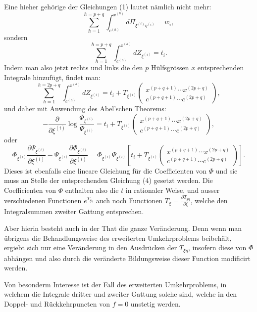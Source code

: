\documentclass[10pt]{article}
\begin{document}
Eine hieher gehörige der Gleichungen (1) lautet nämlich nicht mehr:
\[
\sum_{h=1}^{h=p+q}\int_{c^{(h)}}^{x^{(h)}}d\Pi_{\xi^{(i)}\eta^{(i)}}=w_i,
\]
sondern
\[
\sum_{h=1}^{h=p+q}\int_{c^{(h)}}^{x^{(h)}}dZ_{\xi^{(i)}}=t_i.
\]
Indem man also jetzt rechts und links die den \(p\) Hülfsgrössen \(x\) entsprechenden Integrale hinzufügt, findet man:
\[
\sum_{h=1}^{h=2p+q}\int_{c^{(h)}}^{x^{(h)}}dZ_{\xi^{(i)}}=t_i+T_{\xi^{(i)}}\begin{pmatrix}x^{(p+q+1)}\cdots x^{(2p+q)}\\c^{(p+q+1)}\cdots c^{(2p+q)}\end{pmatrix},
\]
und daher mit Anwendung des Abel'schen Theorems:
\[
-\frac{\partial}{\partial\xi^{(i)}}\log\frac{\Phi_{\xi^{(i)}}}{\Psi_{\xi^{(i)}}}
=t_i+T_{\xi^{(i)}}\begin{pmatrix}x^{(p+q+1)}\cdots x^{(2p+q)}\\c^{(p+q+1)}\cdots c^{(2p+q)}\end{pmatrix},
\]
oder
\begingroup\footnotesize
\[
\Phi_{\xi^{(i)}}\frac{\partial\Psi_{\xi^{(i)}}}{\partial\xi^{(i)}}
-\Psi_{\xi^{(i)}}\frac{\partial\Phi_{\xi^{(i)}}}{\partial\xi^{(i)}}
=\Phi_{\xi^{(i)}}\Psi_{\xi^{(i)}}
\left[t_i+T_{\xi^{(i)}}\begin{pmatrix}x^{(p+q+1)}\cdots x^{(2p+q)}\\c^{(p+q+1)}\cdots c^{(2p+q)}\end{pmatrix}\right].
\]
\endgroup
Dieses ist ebenfalls eine lineare Gleichung für die Coefficienten von \(\Phi\) und sie muss an Stelle der entsprechenden Gleichung (4) gesetzt werden. Die Coefficienten von \(\Phi\) enthalten also die \(t\) in rationaler Weise, und ausser verschiedenen Functionen \(e^{T_{\xi\eta}}\) auch noch Functionen \(T_\xi=\frac{\partial T_{\xi\eta}}{\partial\xi}\), welche den Integralsummen zweiter Gattung entsprechen.

Aber hierin besteht auch in der That die ganze Veränderung. Denn wenn man übrigens die Behandlungsweise des erweiterten Umkehrproblems beibehält, ergiebt sich nur eine Veränderung in den Ausdrücken der \(T_{\xi\eta}\), insofern diese von \(\Phi\) abhängen und also durch die veränderte Bildungsweise dieser Function modificirt werden.

Von besonderm Interesse ist der Fall des erweiterten Umkehrproblems, in welchem die Integrale dritter und zweiter Gattung solche sind, welche in den Doppel- und Rückkehrpuncten von \(f=0\) unstetig werden.

\end{document}
